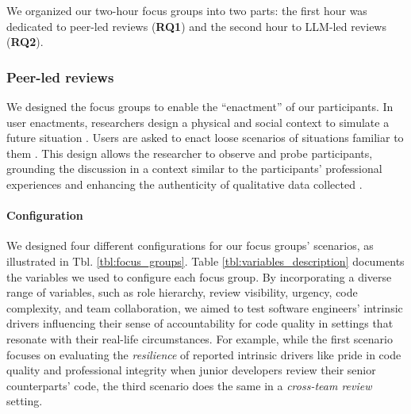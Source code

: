 We organized our two-hour focus groups into two parts: the first hour was dedicated to peer-led reviews (\textbf{RQ1}) and the second hour to LLM-led reviews (\textbf{RQ2}).

\subsubsection{Peer-led reviews}

We designed the focus groups to enable the ``enactment'' of our participants. In user enactments, researchers design a physical and social context to simulate a future situation \citep{odom2012fieldwork}. Users are asked to enact loose scenarios of situations familiar to them \citep{odom2012fieldwork}. This design allows the researcher to observe and probe participants, grounding the discussion in a context similar to the participants' professional experiences \citep{odom2012fieldwork} and enhancing the authenticity of qualitative data collected \citep{carroll2003making}.

\paragraph*{Configuration} We designed four different configurations for our focus groups' scenarios, as illustrated in Tbl. \ref{tbl:focus_groups}. Table \ref{tbl:variables_description} documents the variables we used to configure each focus group. By incorporating a diverse range of variables, such as role hierarchy, review visibility, urgency, code complexity, and team collaboration, we aimed to test software engineers' intrinsic drivers influencing their sense of accountability for code quality in settings that resonate with their real-life circumstances. For example, while the first scenario focuses on evaluating the \textit{resilience} of reported intrinsic drivers like pride in code quality and professional integrity when junior developers review their senior counterparts' code, the third scenario does the same in a \textit{cross-team review} setting.

